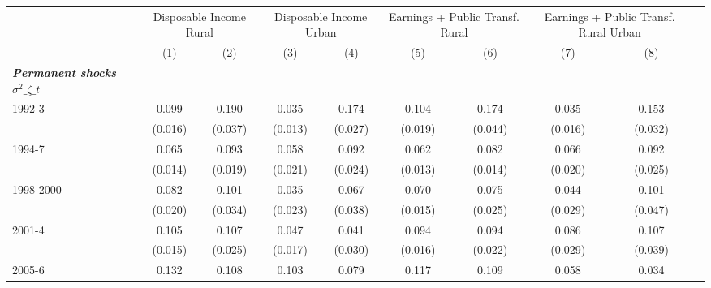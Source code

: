 \begin{tabular}{l*{10}{c}} \toprule
                    &            &\multicolumn{2}{c}{Disposable Income Rural}&\multicolumn{2}{c}{Disposable Income Urban}&\multicolumn{2}{c}{Earnings + Public Transf. Rural}&\multicolumn{2}{c}{Earnings + Public Transf. Rural Urban}\\\cmidrule{3-4}\cmidrule{5-6}\cmidrule{7-8}\cmidrule{9-10}
                    &            &\multicolumn{1}{c}{(1)}&\multicolumn{1}{c}{(2)}&\multicolumn{1}{c}{(3)}&\multicolumn{1}{c}{(4)}&\multicolumn{1}{c}{(5)}&\multicolumn{1}{c}{(6)}&\multicolumn{1}{c}{(7)}&\multicolumn{1}{c}{(8)}\\
\midrule
\textbf{\emph{Permanent shocks $\sigma^2\_{\zeta\_t}$}}&            &            &            &            &            &            &            &            &            \\
\hspace{.3cm} 1992-3&            &       0.099&       0.190&       0.035&       0.174&       0.104&       0.174&       0.035&       0.153\\
                    &            &     (0.016)&     (0.037)&     (0.013)&     (0.027)&     (0.019)&     (0.044)&     (0.016)&     (0.032)\\
\hspace{.3cm} 1994-7&            &       0.065&       0.093&       0.058&       0.092&       0.062&       0.082&       0.066&       0.092\\
                    &            &     (0.014)&     (0.019)&     (0.021)&     (0.024)&     (0.013)&     (0.014)&     (0.020)&     (0.025)\\
\hspace{.3cm} 1998-2000&            &       0.082&       0.101&       0.035&       0.067&       0.070&       0.075&       0.044&       0.101\\
                    &            &     (0.020)&     (0.034)&     (0.023)&     (0.038)&     (0.015)&     (0.025)&     (0.029)&     (0.047)\\
\hspace{.3cm} 2001-4&            &       0.105&       0.107&       0.047&       0.041&       0.094&       0.094&       0.086&       0.107\\
                    &            &     (0.015)&     (0.025)&     (0.017)&     (0.030)&     (0.016)&     (0.022)&     (0.029)&     (0.039)\\
\hspace{.3cm} 2005-6&            &       0.132&       0.108&       0.103&       0.079&       0.117&       0.109&       0.058&       0.034\\

\end{tabular}
